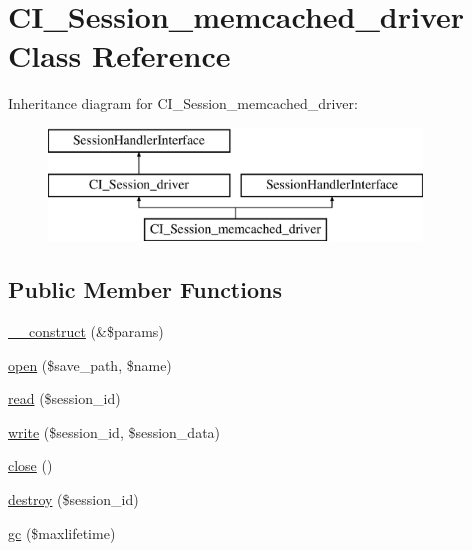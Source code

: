 \hypertarget{class_c_i___session__memcached__driver}{}\section{C\+I\+\_\+\+Session\+\_\+memcached\+\_\+driver Class Reference}
\label{class_c_i___session__memcached__driver}
Inheritance diagram for C\+I\+\_\+\+Session\+\_\+memcached\+\_\+driver\+:\begin{figure}[H]
\begin{center}
\leavevmode
\includegraphics[height=3.000000cm]{class_c_i___session__memcached__driver}
\end{center}
\end{figure}
\subsection*{Public Member Functions}
\begin{DoxyCompactItemize}
\item 
\mbox{\hyperlink{class_c_i___session__memcached__driver_ac1669c73d53d6f16cf5459a1e84d39c8}{\+\_\+\+\_\+construct}} (\&\$params)
\item 
\mbox{\hyperlink{class_c_i___session__memcached__driver_a614b5cf3840833913c7a73260ed28e02}{open}} (\$save\+\_\+path, \$name)
\item 
\mbox{\hyperlink{class_c_i___session__memcached__driver_a5bbf84ebf657be4eaccc0582377c76bf}{read}} (\$session\+\_\+id)
\item 
\mbox{\hyperlink{class_c_i___session__memcached__driver_ad9d124885be93668f1dbf6aace5964f5}{write}} (\$session\+\_\+id, \$session\+\_\+data)
\item 
\mbox{\hyperlink{class_c_i___session__memcached__driver_aa69c8bf1f1dcf4e72552efff1fe3e87e}{close}} ()
\item 
\mbox{\hyperlink{class_c_i___session__memcached__driver_aaec5812f6b4eb6835f88d3baa06a002a}{destroy}} (\$session\+\_\+id)
\item 
\mbox{\hyperlink{class_c_i___session__memcached__driver_a57aff7ee0656d8aa75d545fb8b3ae35d}{gc}} (\$maxlifetime)
\end{DoxyCompactItemize}
